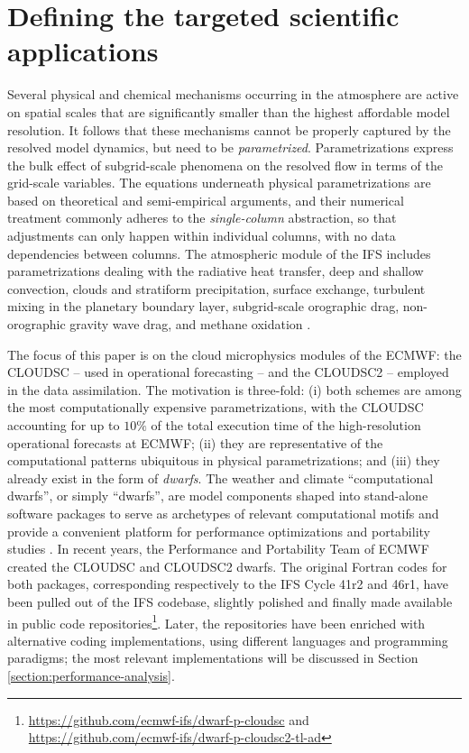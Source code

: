 \documentclass[gmd,manuscript,online]{copernicus}
\theoremstyle{theorem}
\theoremstyle{definition}
\theoremstyle{remark}
\theoremstyle{proposition}
\begin{document}
	\section{Defining the targeted scientific applications}
	\label{section:target-cloud-microphysics-schemes}

	Several physical and chemical mechanisms occurring in the atmosphere are active on spatial scales that are significantly smaller than the highest affordable model resolution. It follows that these mechanisms cannot be properly captured by the resolved model dynamics, but need to be \emph{parametrized}. Parametrizations express the bulk effect of subgrid-scale phenomena on the resolved flow in terms of the grid-scale variables. The equations underneath physical parametrizations are based on theoretical and semi-empirical arguments, and their numerical treatment commonly adheres to the \emph{single-column} abstraction, so that adjustments can only happen within individual columns, with no data dependencies between columns. The atmospheric module of the IFS includes parametrizations dealing with the radiative heat transfer, deep and shallow convection, clouds and stratiform precipitation, surface exchange, turbulent mixing in the planetary boundary layer, subgrid-scale orographic drag, non-orographic gravity wave drag, and methane oxidation \citep{ifs48r1}.

	The focus of this paper is on the cloud microphysics modules of the ECMWF: the CLOUDSC -- used in operational forecasting -- and the CLOUDSC2 -- employed in the data assimilation. The motivation is three-fold: (i) both schemes are among the most computationally expensive parametrizations, with the CLOUDSC accounting for up to $10\%$ of the total execution time of the high-resolution operational forecasts at ECMWF; (ii) they are representative of the computational patterns ubiquitous in physical parametrizations; and (iii) they already exist in the form of \emph{dwarfs}. The weather and climate ``computational dwarfs'', or simply ``dwarfs'', are model components shaped into stand-alone software packages to serve as archetypes of relevant computational motifs \citep{muller19} and provide a convenient platform for performance optimizations and portability studies \citep{bauer20}. In recent years, the Performance and Portability Team of ECMWF created the CLOUDSC and CLOUDSC2 dwarfs. The original Fortran codes for both packages, corresponding respectively to the IFS Cycle 41r2 and 46r1, have been pulled out of the IFS codebase, slightly polished and finally made available in public code repositories\footnote{\url{https://github.com/ecmwf-ifs/dwarf-p-cloudsc} and \url{https://github.com/ecmwf-ifs/dwarf-p-cloudsc2-tl-ad}}. Later, the repositories have been enriched with alternative coding implementations, using different languages and programming paradigms; the most relevant implementations will be discussed in Section \ref{section:performance-analysis}.
\end{document}
